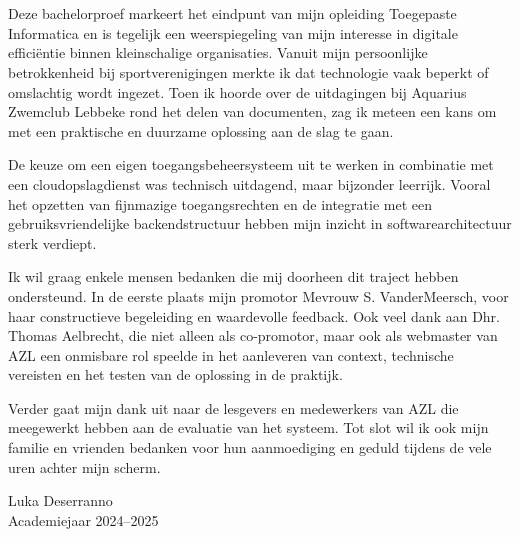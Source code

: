 
\chapter*{}%
\label{ch:voorwoord}

Deze bachelorproef markeert het eindpunt van mijn opleiding Toegepaste Informatica en is tegelijk een weerspiegeling van mijn interesse in digitale efficiëntie binnen kleinschalige organisaties. Vanuit mijn persoonlijke betrokkenheid bij sportverenigingen merkte ik dat technologie vaak beperkt of omslachtig wordt ingezet. Toen ik hoorde over de uitdagingen bij Aquarius Zwemclub Lebbeke rond het delen van documenten, zag ik meteen een kans om met een praktische en duurzame oplossing aan de slag te gaan.

De keuze om een eigen toegangsbeheersysteem uit te werken in combinatie met een cloudopslagdienst was technisch uitdagend, maar bijzonder leerrijk. Vooral het opzetten van fijnmazige toegangsrechten en de integratie met een gebruiksvriendelijke backendstructuur hebben mijn inzicht in softwarearchitectuur sterk verdiept.

Ik wil graag enkele mensen bedanken die mij doorheen dit traject hebben ondersteund. In de eerste plaats mijn promotor Mevrouw S. VanderMeersch, voor haar constructieve begeleiding en waardevolle feedback. Ook veel dank aan Dhr. Thomas Aelbrecht, die niet alleen als co-promotor, maar ook als webmaster van AZL een onmisbare rol speelde in het aanleveren van context, technische vereisten en het testen van de oplossing in de praktijk.

Verder gaat mijn dank uit naar de lesgevers en medewerkers van AZL die meegewerkt hebben aan de evaluatie van het systeem. Tot slot wil ik ook mijn familie en vrienden bedanken voor hun aanmoediging en geduld tijdens de vele uren achter mijn scherm.

Luka Deserranno \\
Academiejaar 2024–2025
